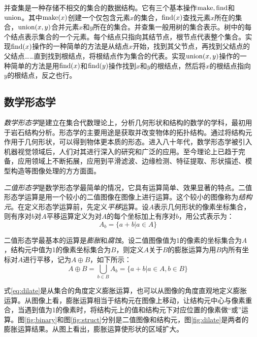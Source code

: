 并查集是一种存储不相交的集合的数据结构。它有三个基本操作$\operatorname{make},\operatorname{find}$和$\operatorname{union}$。其中$\operatorname{make}(x)$创建一个仅包含元素$x$的集合，$\operatorname{find}(x)$查找元素$x$所在的集合，$\operatorname{union}(x,y)$合并元素$x$和$y$所在的集合。并查集一般用树的集合表示。树中的每个结点表示集合的一个元素。每个结点只指向其结节点，根节点代表整个集合。实现$\operatorname{find}(x)$操作的一种简单的方法是从结点$x$开始，找到其父节点，再找到父结点的父结点……直到找到根结点，将根结点作为集合的代表。实现$\operatorname{union}(x,y)$操作的一种简单的方法是用$\operatorname{find}(x)$和$\operatorname{find}(y)$操作找到$x$和$y$的根结点，然后将$x$的根结点指向$y$的根结点，反之也行。

\subsection{数学形态学}\label{sec:morph}

\emph{数学形态学}是建立在集合代数理论上，分析几何形状和结构的数学的学科，最初用于岩石结构分析。形态学的主要用途是获取并改变物体的拓扑结构。通过将结构元作用于几何形状，可以得到物体更本质的形态。进入八十年代，数学形态学被引入机器视觉领域后，人们对其进行深入的研究和广泛的应用。至今理论上已趋于完备，应用领域上不断拓展，应用到平滑滤波、边缘检测、特征提取、形状描述、模型构造等图像处理的方方面面。

\emph{二值形态学}是数学形态学最简单的情况，它具有运算简单、效果显著的特点。二值形态学运算是用一个较小的二值图像在图像上进行运算。这个较小的图像称为\emph{结构元}。在定义形态学运算前，先定义\emph{平移}运算。设$A$表示几何形状的像素坐标集合，则有序对$b$对$A$平移运算定义为对$A$的每个坐标加上有序对$b$，用公式表示为：
\begin{equation}
  \label{eq:shift}
  A_b=\{a+b|a\in A\}
\end{equation}

二值形态学最基本的运算是\emph{膨胀}和\emph{腐蚀}。设二值图像值为1的像素的坐标集合为$A$，结构元中值为1的像素坐标集合为$B$，则定义$A$关于$B$的膨胀运算为用$B$内所有坐标对$A$进行平移，记为$A\oplus B$，如下所示：
\begin{equation}
  \label{eq:dilate}
  A\oplus B=\bigcup_{b\in B}A_b=\{a+b|a\in A,b\in B\}
\end{equation}

式\eqref{eq:dilate}是从集合的角度定义膨胀运算，也可以从图像的角度直观地定义膨胀运算。从图像上看，膨胀运算相当于结构元在图像上移动，让结构元中心与像素重合，当遇到值为1的像素时，将结构元上的值和结构元下对应位置的像素做“或”运算。图\ref{fig:binary}和图\ref{fig:struct}分别是二值图像和结构元，图\ref{fig:dilate}是两者的膨胀运算结果。从图上看出，膨胀运算使形状的区域扩大。

